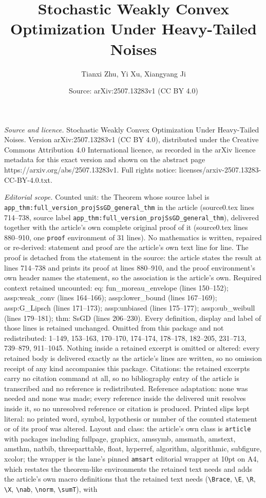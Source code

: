 \documentclass[10pt,a4paper]{amsart}
\title[Stochastic Weakly Convex Optimization Under Heavy-Tailed Noi]{Stochastic Weakly Convex Optimization Under Heavy-Tailed Noises}
\author{Tianxi Zhu, Yi Xu, Xiangyang Ji}
\date{Source: arXiv:2507.13283v1 (CC BY 4.0)}
\begin{document}
\maketitle

\noindent\emph{Source and licence.} Stochastic Weakly Convex Optimization Under Heavy-Tailed Noises. Version arXiv:2507.13283v1 (CC BY 4.0), distributed under the Creative Commons Attribution 4.0 International licence, as recorded in the arXiv licence metadata for this exact version and shown on the abstract page https://arxiv.org/abs/2507.13283v1. Full rights notice: licenses/arxiv-2507.13283-CC-BY-4.0.txt.\par\smallskip

\noindent\textit{Editorial scope.} Counted unit: the Theorem whose source label is \texttt{app\_thm:full\_version\_projSsGD\_general\_thm} in the article (source0.tex lines 714--738, source label \texttt{app\_thm:full\_version\_projSsGD\_general\_thm}), delivered together with the article's own complete original proof of it (source0.tex lines 880--910, one \texttt{proof} environment of 31 lines). No mathematics is written, repaired or re-derived: statement and proof are the article's own text line for line. The proof is detached from the statement in the source: the article states the result at lines 714--738 and prints its proof at lines 880--910, and the proof environment's own header names the statement, so the association is the article's own. Required context retained uncounted: eq: fun\_moreau\_envelope (lines 150--152); assp:weak\_conv (lines 164--166); assp:lower\_bound (lines 167--169); assp:G\_Lipsch (lines 171--173); assp:unbiased (lines 175--177); assp:sub\_weibull (lines 179--181); thm: SsGD (lines 206--230). Every definition, display and label of those lines is retained unchanged. Omitted from this package and not redistributed: 1--149, 153--163, 170--170, 174--174, 178--178, 182--205, 231--713, 739--879, 911--1045. Nothing inside a retained excerpt is omitted or altered: every retained body is delivered exactly as the article's lines are written, so no omission receipt of any kind accompanies this package. Citations: the retained excerpts carry no citation command at all, so no bibliography entry of the article is transcribed and no reference is redistributed. Reference adaptation: none was needed and none was made; every reference inside the delivered unit resolves inside it, so no unresolved reference or citation is produced. Printed slips kept literal: no printed word, symbol, hypothesis or number of the counted statement or of its proof was altered. Layout and class: the article's own class is \texttt{article} with packages including fullpage, graphicx, amssymb, amsmath, amstext, amsthm, natbib, threeparttable, float, hyperref, algorithm, algorithmic, subfigure, xcolor; the wrapper is the lane's pinned \texttt{amsart} editorial wrapper at 10pt on A4, which restates the theorem-like environments the retained text needs and adds the article's own macro definitions that the retained text needs (\texttt{\textbackslash Brace}, \texttt{\textbackslash E}, \texttt{\textbackslash R}, \texttt{\textbackslash X}, \texttt{\textbackslash nab}, \texttt{\textbackslash norm}, \texttt{\textbackslash sumT}), with 
\end{document}
